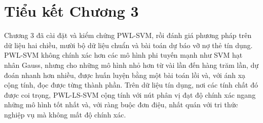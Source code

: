 \section*{Tiểu kết Chương 3}

Chương 3 đã cài đặt và kiểm chứng PWL-SVM, rồi đánh giá phương pháp trên dữ liệu hai chiều, mười bộ dữ liệu chuẩn và bài toán dự báo vỡ nợ thẻ tín dụng. PWL-SVM không chính xác hơn các mô hình phi tuyến mạnh như SVM hạt nhân Gauss, nhưng cho những mô hình nhỏ hơn từ vài lần đến hàng trăm lần, dự đoán nhanh hơn nhiều, được huấn luyện bằng một bài toán lồi và, với ánh xạ cộng tính, đọc được từng thành phần. Trên dữ liệu tín dụng, nơi các tính chất đó được coi trọng, PWL-LS-SVM cộng tính với nút phân vị đạt độ chính xác ngang những mô hình tốt nhất và, với ràng buộc đơn điệu, nhất quán với tri thức nghiệp vụ mà không mất độ chính xác.
